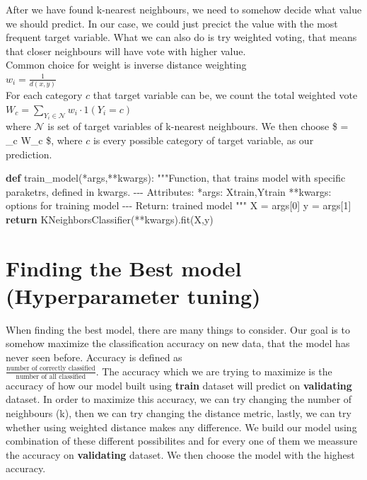 \documentclass[
  letterpaper,
  DIV=11,
  numbers=noendperiod]{scrartcl}
\newenvironment{Shaded}{\begin{snugshade}}{\end{snugshade}}
\newcommand{\CommentTok}[1]{\textcolor[rgb]{0.37,0.37,0.37}{#1}}
\newcommand{\ControlFlowTok}[1]{\textcolor[rgb]{0.00,0.23,0.31}{\textbf{#1}}}
\newcommand{\DecValTok}[1]{\textcolor[rgb]{0.68,0.00,0.00}{#1}}
\newcommand{\KeywordTok}[1]{\textcolor[rgb]{0.00,0.23,0.31}{\textbf{#1}}}
\newcommand{\NormalTok}[1]{\textcolor[rgb]{0.00,0.23,0.31}{#1}}
\newcommand{\OperatorTok}[1]{\textcolor[rgb]{0.37,0.37,0.37}{#1}}
\begin{document}
After we have found k-nearest neighbours, we need to somehow decide what
value we should predict. In our case, we could just precict the value
with the most frequent target variable. What we can also do is try
weighted voting, that means that closer neighbours will have vote with
higher value.\\
Common choice for weight is inverse distance weighting\\
\(w_{i} = \frac{1}{d(x,y)}\)\\
For each category \(c\) that target variable can be, we count the total
weighted vote
\(W_{c} = \sum_{Y_i \in \mathcal{N}} w_i \cdot 1(Y_i = c)\)\\
where \(\mathcal{N}\) is set of target variables of k-nearest
neighbours. We then choose \$ = \arg\max\_c W\_c \$, where \(c\)
is every possible category of target variable, as our prediction.

\begin{Shaded}
\begin{Highlighting}[]
\KeywordTok{def}\NormalTok{ train\_model(}\OperatorTok{*}\NormalTok{args,}\OperatorTok{**}\NormalTok{kwargs):}
    \CommentTok{"""Function, that trains model with specific paraketrs, defined in kwargs.}
\CommentTok{    {-}{-}{-}}
\CommentTok{    Attributes:}
\CommentTok{    *args: Xtrain,Ytrain}
\CommentTok{    **kwargs: options for training model}
\CommentTok{    {-}{-}{-}}
\CommentTok{    Return: trained model}
\CommentTok{    """}
\NormalTok{    X }\OperatorTok{=}\NormalTok{ args[}\DecValTok{0}\NormalTok{]}
\NormalTok{    y }\OperatorTok{=}\NormalTok{ args[}\DecValTok{1}\NormalTok{]}
    \ControlFlowTok{return}\NormalTok{ KNeighborsClassifier(}\OperatorTok{**}\NormalTok{kwargs).fit(X,y)}
\end{Highlighting}
\end{Shaded}

\section{Finding the Best model (Hyperparameter
tuning)}\label{finding-the-best-model-hyperparameter-tuning}

When finding the best model, there are many things to consider. Our goal
is to somehow maximize the classification accuracy on new data, that the
model has never seen before. Accuracy is defined as\\
\(\frac{ \text{number of correctly classified}}{ \text{number of all classified}}\).
The accuracy which we are trying to maximize is the accuracy of how our
model built using \textbf{train} dataset will predict on
\textbf{validating} dataset. In order to maximize this accuracy, we can
try changing the number of neighbours (k), then we can try changing the
distance metric, lastly, we can try whether using weighted distance
makes any difference. We build our model using combination of these
different possibilites and for every one of them we meassure the
accuracy on \textbf{validating} dataset. We then choose the model with
the highest accuracy.
\end{document}
